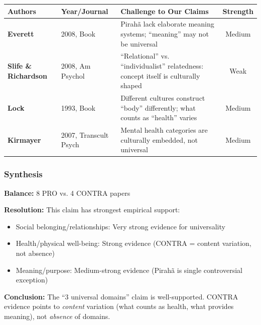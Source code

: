 \begin{center}
\scriptsize
\begin{longtable}{@{}p{3cm}p{2cm}p{6cm}c@{}}
\toprule
\textbf{Authors} & \textbf{Year/Journal} & \textbf{Challenge to Our Claims} & \textbf{Strength} \\
\midrule
\endfirsthead
\bottomrule
\endlastfoot
\textbf{Everett} & 2008, Book & Pirahã lack elaborate meaning systems; ``meaning'' may not be universal & Medium \\
\textbf{Slife \& Richardson} & 2008, Am Psychol & ``Relational'' vs. ``individualist'' relatedness: concept itself is culturally shaped & Weak \\
\textbf{Lock} & 1993, Book & Different cultures construct ``body'' differently; what counts as ``health'' varies & Medium \\
\textbf{Kirmayer} & 2007, Transcult Psych & Mental health categories are culturally embedded, not universal & Medium \\
\end{longtable}
\end{center}

\subsubsection{Synthesis}

\begin{tcolorbox}[colback=green!5!white, colframe=green!75!black, title=Evidence Synthesis: Claim 4]

\textbf{Balance:} 8 PRO vs. 4 CONTRA papers

\textbf{Resolution:} This claim has strongest empirical support:
\begin{itemize}[nosep]
\item Social belonging/relationships: Very strong evidence for universality
\item Health/physical well-being: Strong evidence (CONTRA = content variation, not absence)
\item Meaning/purpose: Medium-strong evidence (Pirahã is single controversial exception)
\end{itemize}

\textbf{Conclusion:} The ``3 universal domains'' claim is well-supported. CONTRA evidence points to \textit{content} variation (what counts as health, what provides meaning), not \textit{absence} of domains.

\end{tcolorbox}

